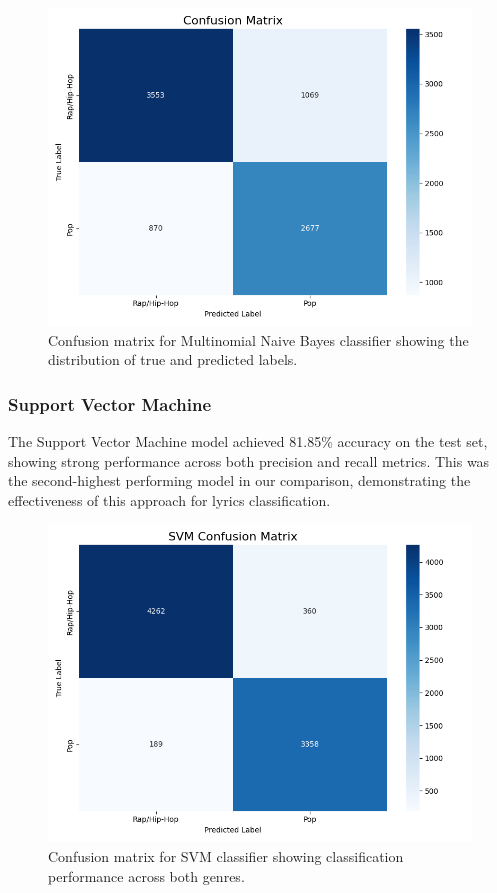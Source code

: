 \documentclass[conference]{IEEEtran}
\begin{document}
\begin{figure}[htbp]
\centerline{\includegraphics[width=0.9\columnwidth]{plots/mnb_confusion_matrix.png}}
\caption{Confusion matrix for Multinomial Naive Bayes classifier showing the distribution of true and predicted labels.}
\label{fig:mnb_confusion}
\end{figure}

\subsubsection{Support Vector Machine}
The Support Vector Machine model achieved 81.85\% accuracy on the test set, showing strong performance across both precision and recall metrics. This was the second-highest performing model in our comparison, demonstrating the effectiveness of this approach for lyrics classification.

\begin{figure}[htbp]
\centerline{\includegraphics[width=0.9\columnwidth]{plots/svm_confusion_matrix.png}}
\caption{Confusion matrix for SVM classifier showing classification performance across both genres.}
\label{fig:svm_confusion}
\end{figure}
\end{document}
